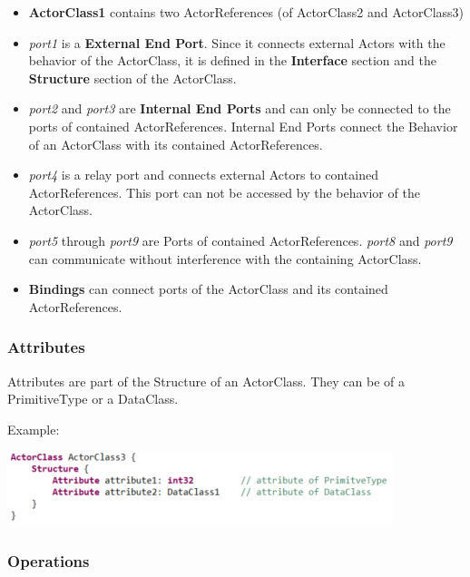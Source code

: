
\begin{itemize}
\item \textbf{ActorClass1} contains two ActorReferences (of ActorClass2 and ActorClass3)
\item \textit{port1} is a \textbf{External End Port}. Since it connects external Actors with the behavior 
of the ActorClass, it is defined in the \textbf{Interface} section and the \textbf{Structure} section of 
the ActorClass.
\item \textit{port2} and \textit{port3} are \textbf{Internal End Ports} and can only be connected to the 
ports of contained ActorReferences. Internal End Ports connect the Behavior of an ActorClass with its 
contained ActorReferences.
\item \textit{port4} is a relay port and connects external Actors to contained ActorReferences. This port 
can not be accessed by the behavior of the ActorClass.
\item \textit{port5} through \textit{port9} are Ports of contained ActorReferences. \textit{port8} and 
\textit{port9} can communicate without interference with the containing ActorClass.
\item \textbf{Bindings} can connect ports of the ActorClass and its contained ActorReferences. 
\end{itemize}

\subsubsection{Attributes}

Attributes are part of the Structure of an ActorClass. They can be of a PrimitiveType or a DataClass.

Example:

\includegraphics{images/040-ActorClassAttributes.png}

\subsubsection{Operations}


